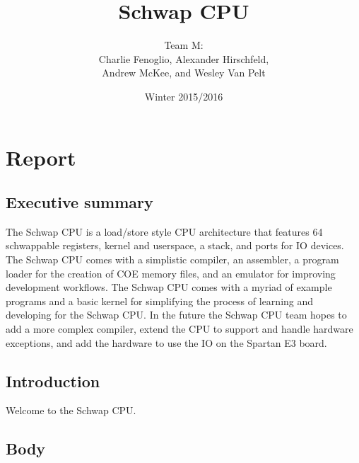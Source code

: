 \documentclass{report}
\title{Schwap CPU}
\author{Team M: \\ Charlie Fenoglio, Alexander Hirschfeld, \\ Andrew McKee, and Wesley Van Pelt}
\date{Winter 2015/2016}
\begin{document}
\maketitle
\setcounter{tocdepth}{4}
\tableofcontents

\chapter{Report}
	\section{Executive summary}
		The Schwap CPU is a load/store style CPU architecture that features 64 schwappable registers, kernel and userspace, a stack, and ports for IO devices. The Schwap CPU comes with a simplistic compiler, an assembler, a program loader for the creation of COE memory files, and an emulator for improving development workflows. The Schwap CPU comes with a myriad of example programs and a basic kernel for simplifying the process of learning and developing for the Schwap CPU. In the future the Schwap CPU team hopes to add a more complex compiler, extend the CPU to support and handle hardware exceptions, and add the hardware to use the IO on the Spartan E3 board.
	\section{Introduction}
		Welcome to the Schwap CPU.
	\section{Body}
\end{document}
